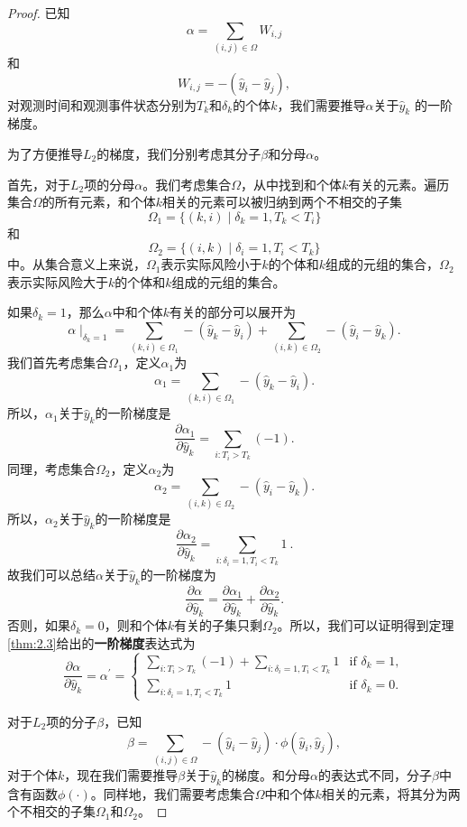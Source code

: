 \begin{proof}
已知$$\alpha = \sum_{(i,j)\in \Omega} W_{i,j}$$ 和 $$W_{i,j}=-(\hat{y}_i-\hat{y}_j),$$对观测时间和观测事件状态分别为$T_k$和$\delta_k$的个体$k$，我们需要推导$\alpha$关于$\hat{y}_k$ 的一阶梯度。

为了方便推导$L_2$的梯度，我们分别考虑其分子$\beta$和分母$\alpha$。

首先，对于$L_2$项的分母$\alpha$。我们考虑集合$\Omega$，从中找到和个体$k$有关的元素。遍历集合$\Omega$的所有元素，和个体$k$相关的元素可以被归纳到两个不相交的子集$$\Omega_1=\{(k,i) \mid \delta_k=1,T_k < T_i\}$$ 和 $$\Omega_2=\{(i,k) \mid \delta_i=1,T_i < T_k\}$$中。从集合意义上来说，$\Omega_1$表示实际风险小于$k$的个体和$k$组成的元组的集合，$\Omega_2$表示实际风险大于$k$的个体和$k$组成的元组的集合。

如果$\delta_k = 1$，那么$\alpha$中和个体$k$有关的部分可以展开为$$\alpha \mid_{\delta_k=1}=\sum_{(k,i)\in \Omega_1} -(\hat{y}_k-\hat{y}_i) + \sum_{(i,k)\in \Omega_2} -(\hat{y}_i-\hat{y}_k). $$ 我们首先考虑集合$\Omega_1$，定义$\alpha_1$为$$\alpha_1 = \sum_{(k,i)\in \Omega_1} -(\hat{y}_k-\hat{y}_i).$$ 所以，$\alpha_1$关于$\hat{y}_k$的一阶梯度是$$\frac{\partial \alpha_1}{\partial \hat{y}_k} = \sum\limits_{i: T_i>T_k}(-1).$$ 同理，考虑集合$\Omega_2$，定义$\alpha_2$为$$\alpha_2 = \sum_{(i,k)\in \Omega_2} -(\hat{y}_i-\hat{y}_k).$$ 所以，$\alpha_2$关于$\hat{y}_k$的一阶梯度是$$\frac{\partial \alpha_2}{\partial \hat{y}_k} = \sum\limits_{i: \delta_i=1,T_i<T_k} 1\ .$$ 故我们可以总结$\alpha$关于$\hat{y}_k$的一阶梯度为$$\frac{\partial \alpha}{\partial \hat{y}_k} = \frac{\partial \alpha_1}{\partial \hat{y}_k} + \frac{\partial \alpha_2}{\partial \hat{y}_k}.$$ 否则，如果$\delta_k = 0$，则和个体$k$有关的子集只剩$\Omega_2$。所以，我们可以证明得到定理\ref{thm:2.3}给出的\textbf{一阶梯度}表达式为$$
\frac{\partial \alpha}{\partial \hat{y}_k}=\alpha^{'}=
\begin{cases}
\sum\limits_{i: T_i>T_k}(-1) + \sum\limits_{i: \delta_i=1,T_i<T_k} 1 & \text{if } \delta_k = 1,\\
\sum\limits_{i: \delta_i=1,T_i<T_k} 1 & \text{if } \delta_k = 0.
\end{cases}
$$

对于$L_2$项的分子$\beta$，已知$$\beta = \sum_{(i,j)\in \Omega} -(\hat{y}_i-\hat{y}_j) \cdot \phi(\hat{y}_i, \hat{y}_j),$$ 对于个体$k$，现在我们需要推导$\beta$关于$\hat{y}_k$的梯度。和分母$\alpha$的表达式不同，分子$\beta$中含有函数$\phi(\cdot)$。同样地，我们需要考虑集合$\Omega$中和个体$k$相关的元素，将其分为两个不相交的子集$\Omega_1$和$\Omega_2$。


\end{proof}
